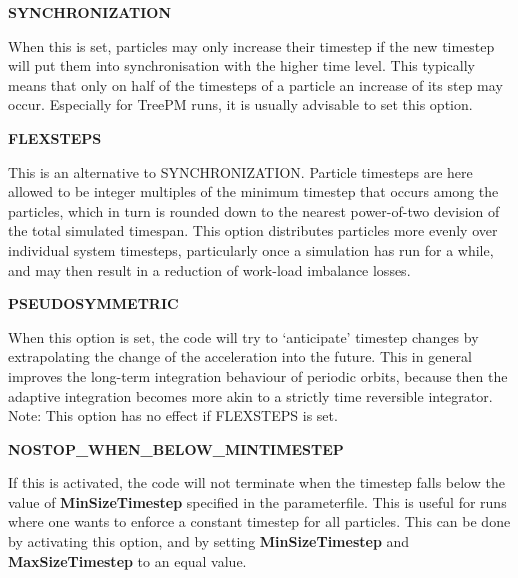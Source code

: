 \begin{DoxyItemize}
\item {\bfseries \-S\-Y\-N\-C\-H\-R\-O\-N\-I\-Z\-A\-T\-I\-O\-N} \par
 \-When this is set, particles may only increase their timestep if the new timestep will put them into synchronisation with the higher time level. \-This typically means that only on half of the timesteps of a particle an increase of its step may occur. \-Especially for \-Tree\-P\-M runs, it is usually advisable to set this option.
\end{DoxyItemize}


\begin{DoxyItemize}
\item {\bfseries \-F\-L\-E\-X\-S\-T\-E\-P\-S} \par
 \-This is an alternative to \-S\-Y\-N\-C\-H\-R\-O\-N\-I\-Z\-A\-T\-I\-O\-N. \-Particle timesteps are here allowed to be integer multiples of the minimum timestep that occurs among the particles, which in turn is rounded down to the nearest power-\/of-\/two devision of the total simulated timespan. \-This option distributes particles more evenly over individual system timesteps, particularly once a simulation has run for a while, and may then result in a reduction of work-\/load imbalance losses.
\end{DoxyItemize}


\begin{DoxyItemize}
\item {\bfseries \-P\-S\-E\-U\-D\-O\-S\-Y\-M\-M\-E\-T\-R\-I\-C} \par
 \-When this option is set, the code will try to `anticipate' timestep changes by extrapolating the change of the acceleration into the future. \-This in general improves the long-\/term integration behaviour of periodic orbits, because then the adaptive integration becomes more akin to a strictly time reversible integrator. \-Note\-: \-This option has no effect if \-F\-L\-E\-X\-S\-T\-E\-P\-S is set.
\end{DoxyItemize}


\begin{DoxyItemize}
\item {\bfseries \-N\-O\-S\-T\-O\-P\-\_\-\-W\-H\-E\-N\-\_\-\-B\-E\-L\-O\-W\-\_\-\-M\-I\-N\-T\-I\-M\-E\-S\-T\-E\-P} \par
 \-If this is activated, the code will not terminate when the timestep falls below the value of {\bfseries \-Min\-Size\-Timestep} specified in the parameterfile. \-This is useful for runs where one wants to enforce a constant timestep for all particles. \-This can be done by activating this option, and by setting {\bfseries \-Min\-Size\-Timestep} and {\bfseries \-Max\-Size\-Timestep} to an equal value.
\end{DoxyItemize}


